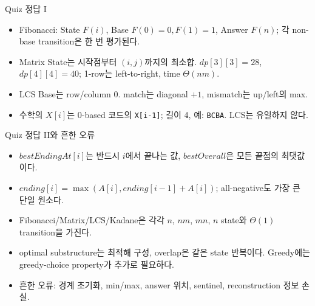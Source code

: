 \begin{frame}{Quiz 정답 I}
\small\begin{itemize}
\item Fibonacci: State $F(i)$, Base $F(0)=0,F(1)=1$, Answer $F(n)$; 각 non-base transition은 한 번 평가된다.
\item Matrix State는 시작점부터 $(i,j)$까지의 최소합. $dp[3][3]=28$, $dp[4][4]=40$; 1-row는 left-to-right, time $\Theta(nm)$.
\item LCS Base는 row/column 0. match는 diagonal $+1$, mismatch는 up/left의 max.
\item 수학의 $X[i]$는 0-based 코드의 \texttt{X[i-1]}; 길이 4, 예: \texttt{BCBA}. LCS는 유일하지 않다.
\end{itemize}
\end{frame}
\begin{frame}{Quiz 정답 II와 흔한 오류}
\small\begin{itemize}
\item $bestEndingAt[i]$는 반드시 $i$에서 끝나는 값, $bestOverall$은 모든 끝점의 최댓값이다.
\item $ending[i]=\max(A[i],ending[i-1]+A[i])$; all-negative도 가장 큰 단일 원소다.
\item Fibonacci/Matrix/LCS/Kadane은 각각 $n$, $nm$, $mn$, $n$ state와 $\Theta(1)$ transition을 가진다.
\item optimal substructure는 최적해 구성, overlap은 같은 state 반복이다. Greedy에는 greedy-choice property가 추가로 필요하다.
\item 흔한 오류: 경계 초기화, min/max, answer 위치, sentinel, reconstruction 정보 손실.
\end{itemize}
\end{frame}
